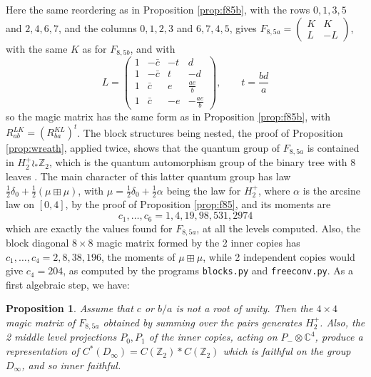 \documentclass[11pt]{amsart}
\newtheorem{proposition}[theorem]{Proposition}
\begin{document}
Here the same reordering as in Proposition \ref{prop:f85b}, with the rows $0,1,3,5$ and $2,4,6,7$, and the columns $0,1,2,3$ and $6,7,4,5$, gives $F_{8,5a}=\begin{pmatrix}K&K\\ L&-L\end{pmatrix}$, with the same $K$ as for $F_{8,5b}$, and with
$$L=\begin{pmatrix}1&-\bar{c}&-t&d\\ 1&-\bar{c}&t&-d\\ 1&\bar{c}&e&\frac{ae}{b}\\ 1&\bar{c}&-e&-\frac{ae}{b}\end{pmatrix},\qquad t=\frac{bd}{a}$$
so the magic matrix has the same form as in Proposition \ref{prop:f85b}, with $R^{LK}_{ab}=(R^{KL}_{ba})^t$. The block structures being nested, the proof of Proposition \ref{prop:wreath}, applied twice, shows that the quantum group of $F_{8,5a}$ is contained in $H_2^+\wr_*\mathbb Z_2$, which is the quantum automorphism group of the binary tree with 8 leaves \cite{dkr,dfk}. The main character of this latter quantum group has law $\frac{1}{2}\delta_0+\frac{1}{2}(\mu\boxplus\mu)$, with $\mu=\frac{1}{2}\delta_0+\frac{1}{2}\alpha$ being the law for $H_2^+$, where $\alpha$ is the arcsine law on $[0,4]$, by the proof of Proposition \ref{prop:f85}, and its moments are
$$c_1,\ldots,c_6=1,4,19,98,531,2974$$
which are exactly the values found for $F_{8,5a}$, at all the levels computed. Also, the block diagonal $8\times8$ magic matrix formed by the 2 inner copies has $c_1,\ldots,c_4=2,8,38,196$, the moments of $\mu\boxplus\mu$, while 2 independent copies would give $c_4=204$, as computed by the programs \texttt{blocks.py} and \texttt{freeconv.py}. As a first algebraic step, we have:

\begin{proposition}\label{prop:f85a}
Assume that $c$ or $b/a$ is not a root of unity. Then the $4\times4$ magic matrix of $F_{8,5a}$ obtained by summing over the pairs generates $H_2^+$. Also, the 2 middle level projections $P_0,P_1$ of the inner copies, acting on $P_-\otimes\mathbb C^4$, produce a representation of $C^*(D_\infty)=C(\mathbb Z_2)*C(\mathbb Z_2)$ which is faithful on the group $D_\infty$, and so inner faithful.
\end{proposition}
\end{document}
